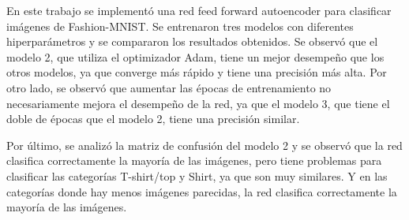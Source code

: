 \documentclass[aps,prl,reprint,groupedaddress]{revtex4-2}
\begin{document}
En este trabajo se implementó una red feed forward autoencoder para clasificar
imágenes de Fashion-MNIST. Se entrenaron tres modelos con diferentes 
hiperparámetros y se compararon los resultados obtenidos. Se observó que el 
modelo 2, que utiliza el optimizador Adam, tiene un mejor desempeño que los 
otros modelos, ya que converge más rápido y tiene una precisión más alta. Por 
otro lado, se observó que aumentar las épocas de entrenamiento no 
necesariamente mejora el desempeño de la red, ya que el modelo 3, que tiene 
el doble de épocas que el modelo 2, tiene una precisión similar. 

Por último, se analizó la matriz de confusión del modelo 2 y se observó que la red 
clasifica correctamente la mayoría de las imágenes, pero tiene problemas para 
clasificar las categorías T-shirt/top y Shirt, ya que son muy similares. Y en 
las categorías donde hay menos imágenes parecidas, la red clasifica 
correctamente la mayoría de las imágenes.




\end{document}
